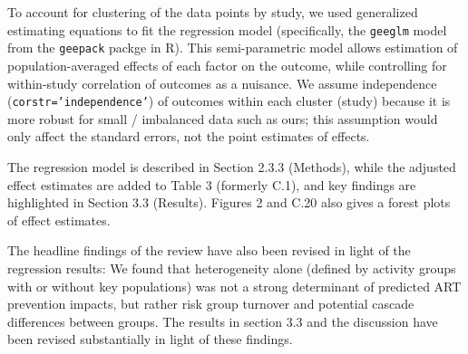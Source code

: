 \begin{comment}\label{reg.2}
A related concern is that the tests for statistically significant differences in the univariable analysis appear problematic. When you use the Kruskal-Wallis test you are assuming independence of observations. But here the observations are not statistically independent of one another - in many cases multiple observations are being taken from the same study (and there is likely to be a high degree of within-study correlation). By not taking into account the within-study correlation I think you exaggerate the significance of the differences between model types. That might explain some of the odd results in Table C1 (for example a statistically significant positive relationship between HCT behaviour change and the incidence reduction, but a significant negative relationship between HCT behaviour change and the cumulative \% of infections averted). If you use a meta-regression approach, you should be able to control for the within-study correlation.
\end{comment}
\begin{response}
To account for clustering of the data points by study, we used generalized estimating equations to fit the regression model
(specifically, the \texttt{geeglm} model from the \texttt{geepack} packge in R).
This semi-parametric model allows estimation of population-averaged effects of each factor on the outcome,
while controlling for within-study correlation of outcomes as a nuisance.
We assume independence (\texttt{corstr='independence'}) of outcomes within each cluster (study) because it is more robust for small / imbalanced data such as ours;
this assumption would only affect the standard errors, not the point estimates of effects.
\par
The regression model is described in Section 2.3.3 (Methods),
while the adjusted effect estimates are added to Table 3 (formerly C.1),
and key findings are highlighted in Section 3.3 (Results).
Figures 2 and C.20 also gives a forest plots of effect estimates.
\par
The headline findings of the review have also been revised in light of the regression results:
We found that heterogeneity alone (defined by activity groups with or without key populations)
was not a strong determinant of predicted ART prevention impacts,
but rather risk group turnover and potential cascade differences between groups.
The results in section 3.3 and the discussion have been revised substantially in light of these findings.
\end{response}
